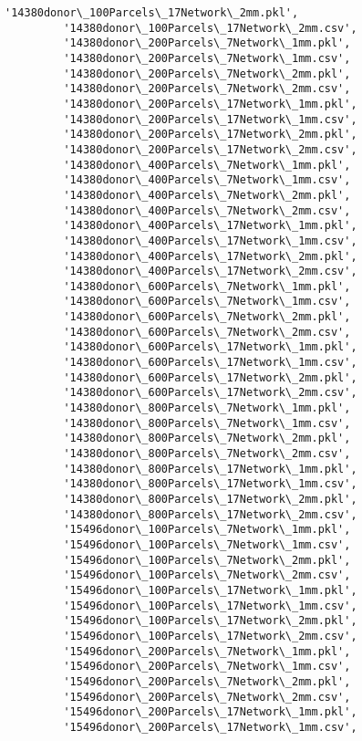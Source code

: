 \documentclass[11pt]{article}
\begin{document}
\begin{Verbatim}[commandchars=\\\{\}]
         '14380donor\_100Parcels\_17Network\_2mm.pkl',
         '14380donor\_100Parcels\_17Network\_2mm.csv',
         '14380donor\_200Parcels\_7Network\_1mm.pkl',
         '14380donor\_200Parcels\_7Network\_1mm.csv',
         '14380donor\_200Parcels\_7Network\_2mm.pkl',
         '14380donor\_200Parcels\_7Network\_2mm.csv',
         '14380donor\_200Parcels\_17Network\_1mm.pkl',
         '14380donor\_200Parcels\_17Network\_1mm.csv',
         '14380donor\_200Parcels\_17Network\_2mm.pkl',
         '14380donor\_200Parcels\_17Network\_2mm.csv',
         '14380donor\_400Parcels\_7Network\_1mm.pkl',
         '14380donor\_400Parcels\_7Network\_1mm.csv',
         '14380donor\_400Parcels\_7Network\_2mm.pkl',
         '14380donor\_400Parcels\_7Network\_2mm.csv',
         '14380donor\_400Parcels\_17Network\_1mm.pkl',
         '14380donor\_400Parcels\_17Network\_1mm.csv',
         '14380donor\_400Parcels\_17Network\_2mm.pkl',
         '14380donor\_400Parcels\_17Network\_2mm.csv',
         '14380donor\_600Parcels\_7Network\_1mm.pkl',
         '14380donor\_600Parcels\_7Network\_1mm.csv',
         '14380donor\_600Parcels\_7Network\_2mm.pkl',
         '14380donor\_600Parcels\_7Network\_2mm.csv',
         '14380donor\_600Parcels\_17Network\_1mm.pkl',
         '14380donor\_600Parcels\_17Network\_1mm.csv',
         '14380donor\_600Parcels\_17Network\_2mm.pkl',
         '14380donor\_600Parcels\_17Network\_2mm.csv',
         '14380donor\_800Parcels\_7Network\_1mm.pkl',
         '14380donor\_800Parcels\_7Network\_1mm.csv',
         '14380donor\_800Parcels\_7Network\_2mm.pkl',
         '14380donor\_800Parcels\_7Network\_2mm.csv',
         '14380donor\_800Parcels\_17Network\_1mm.pkl',
         '14380donor\_800Parcels\_17Network\_1mm.csv',
         '14380donor\_800Parcels\_17Network\_2mm.pkl',
         '14380donor\_800Parcels\_17Network\_2mm.csv',
         '15496donor\_100Parcels\_7Network\_1mm.pkl',
         '15496donor\_100Parcels\_7Network\_1mm.csv',
         '15496donor\_100Parcels\_7Network\_2mm.pkl',
         '15496donor\_100Parcels\_7Network\_2mm.csv',
         '15496donor\_100Parcels\_17Network\_1mm.pkl',
         '15496donor\_100Parcels\_17Network\_1mm.csv',
         '15496donor\_100Parcels\_17Network\_2mm.pkl',
         '15496donor\_100Parcels\_17Network\_2mm.csv',
         '15496donor\_200Parcels\_7Network\_1mm.pkl',
         '15496donor\_200Parcels\_7Network\_1mm.csv',
         '15496donor\_200Parcels\_7Network\_2mm.pkl',
         '15496donor\_200Parcels\_7Network\_2mm.csv',
         '15496donor\_200Parcels\_17Network\_1mm.pkl',
         '15496donor\_200Parcels\_17Network\_1mm.csv',

\end{Verbatim}
\end{document}
